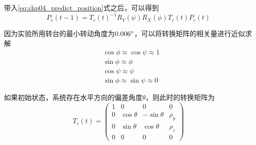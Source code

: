 带入\ref{eq:chp04_predict_position}式之后，可以得到
\begin{equation}
P_c(t-1) =T_c(t)^{-1}R_Y(\psi)R_X(\phi)T_c(t) P_c(t)
\end{equation}

因为实验所用转台的最小转动角度为$0.006 \degree$，可以将转换矩阵的相关量进行近似求解
\begin{align}
&\cos \phi \approx \cos \psi \approx 1 \\
&\sin \phi \approx \phi \\
&\cos \psi \approx \psi \\
&\sin \phi \approx \sin \psi \approx 0
\end{align}

如果初始状态，系统存在水平方向的偏差角度$\theta$，则此时的转换矩阵为
\begin{equation}
T_c(t) =\begin{pmatrix} 1 & 0 & 0 & 0 \\ 0 & \cos \theta & -\sin \theta & \rho_y \\0 & \sin \theta & \cos \theta & \rho_z \\ 0 & 0 & 0 &0 \end{pmatrix}
\end{equation}

